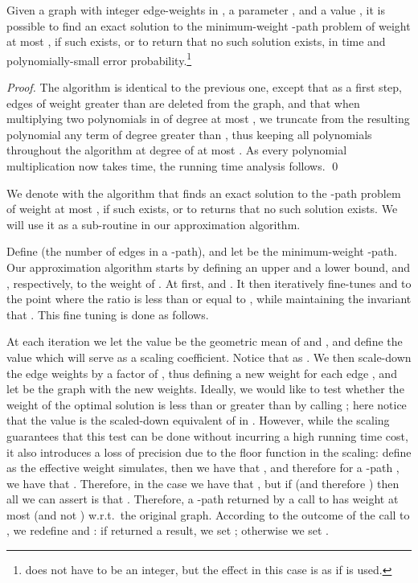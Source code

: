 \documentclass{llncs}
\begin{document}
\begin{proposition}\label{lemma:bound}
Given a graph  with integer edge-weights in , a parameter , and a value , it is possible to find an exact solution to the minimum-weight -path problem of weight at most , if such exists, or to return that no such solution exists, in time  and polynomially-small error probability.\footnote{ does not have to be an integer, but the effect in this case is as if  is used.}
\end{proposition}
\begin{proof}
The algorithm is identical to the previous one, except that as a first step, edges of weight greater than  are deleted from the graph, and that when multiplying two polynomials in  of degree at most , we truncate from the resulting polynomial any term of degree greater than , thus keeping all polynomials throughout the algorithm at degree of at most . As every polynomial multiplication now takes  time, the running time analysis follows.
\qed\end{proof}
We denote with  the algorithm that finds an exact solution to the -path problem of weight at most , if such exists, or to returns that no such solution exists. We will use it as a sub-routine in our approximation algorithm.

Define  (the number of edges in a -path), and let  be the minimum-weight -path. Our approximation algorithm starts by defining an upper and a lower bound,  and , respectively, to the weight of . At first,  and . It then iteratively fine-tunes  and  to the point where the ratio  is less than or equal to , while maintaining the invariant that . This fine tuning is done as follows. 

At each iteration we let the value  be the geometric mean of  and , and define the value  which will serve as a scaling coefficient. Notice that  as . We then scale-down the edge weights by a factor of , thus defining a new weight  for each edge , and let  be the graph with the new weights. 
Ideally, we would like to test whether the weight of the optimal solution is less than or greater than  by calling ; here notice that the value  is the scaled-down equivalent of  in .
However, while the scaling guarantees that this test can be done without incurring a high running time cost, it also introduces a loss of precision due to the floor function in the scaling: define  as the effective weight  simulates, then we have that , and therefore for a -path , we have that . Therefore, in the case  we have that , but if  (and therefore ) then all we can assert is that .
Therefore, a -path returned by a call to  has weight at most  (and not ) w.r.t.\ the original graph. According to the outcome of the call to  , we redefine  and : if  returned a result, we set ; otherwise we set . 
\end{document}
